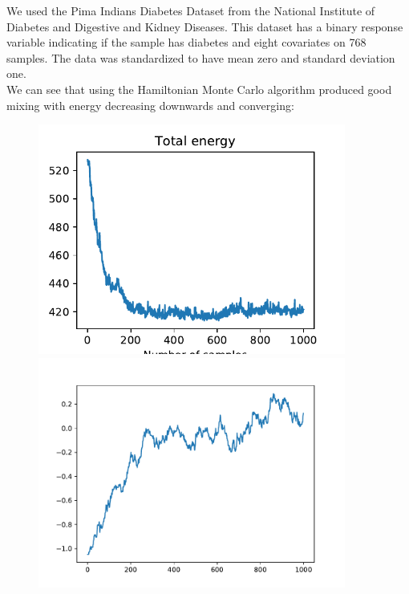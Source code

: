 We used the Pima Indians Diabetes Dataset from the National Institute of Diabetes and Digestive and Kidney Diseases. This dataset has a binary response variable indicating if the sample has diabetes and eight covariates on 768 samples. The data was standardized to have mean zero and standard deviation one.\\

We can see that using the Hamiltonian Monte Carlo algorithm produced good mixing with energy decreasing downwards and converging:

\begin{figure}[H]
	\centering
	\begin{minipage}{0.45\textwidth}
		\centering
		\includegraphics[width=0.9\textwidth]{hmc-energy-pima.pdf} %
	\end{minipage}\hfill
	\begin{minipage}{0.45\textwidth}
		\centering
		\includegraphics[width=0.9\textwidth]{hmc-trace-pima.pdf} %
	\end{minipage}
\end{figure}

